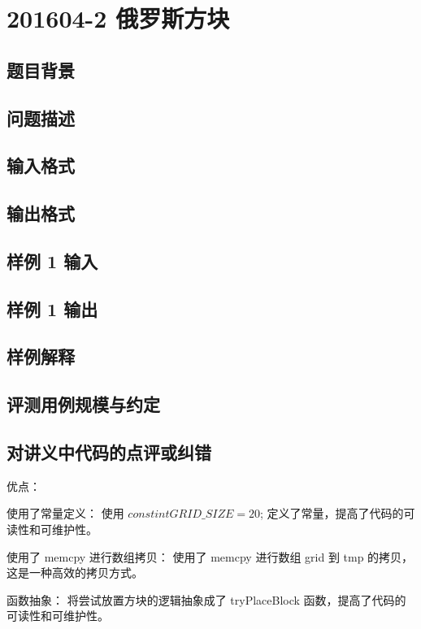 \section{201604-2 俄罗斯方块}

\subsection{题目背景}

\subsection{问题描述}

\subsection{输入格式}

\subsection{输出格式}

\subsection{样例 1 输入}

\subsection{样例 1 输出}

\subsection{样例解释}

\subsection{评测用例规模与约定}

\subsection{对讲义中代码的点评或纠错}
 
优点：

使用了常量定义： 使用 $const int GRID\_SIZE = 20$; 定义了常量，提高了代码的可读性和可维护性。

使用了 memcpy 进行数组拷贝： 使用了 memcpy 进行数组 grid 到 tmp 的拷贝，这是一种高效的拷贝方式。

函数抽象： 将尝试放置方块的逻辑抽象成了 tryPlaceBlock 函数，提高了代码的可读性和可维护性。

